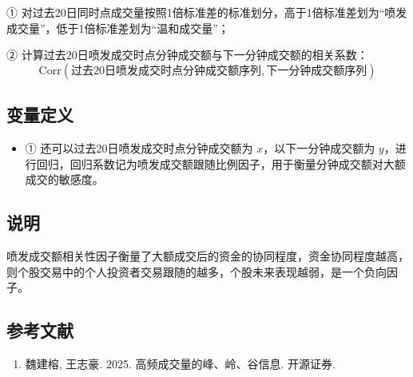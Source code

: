 \documentclass{article}
\begin{document}
① 对过去20日同时点成交量按照1倍标准差的标准划分，高于1倍标准差划为“喷发成交量”，低于1倍标准差划为“温和成交量”；

② 计算过去20日喷发成交时点分钟成交额与下一分钟成交额的相关系数：
\begin{equation}
    \mathrm{Corr}(\text{过去20日喷发成交时点分钟成交额序列}, \text{下一分钟成交额序列})
\end{equation}

\subsection{变量定义}
\begin{itemize}
    \item ① 还可以过去20日喷发成交时点分钟成交额为 \( x \)，以下一分钟成交额为 \( y \)，进行回归，回归系数记为喷发成交额跟随比例因子，用于衡量分钟成交额对大额成交的敏感度。
\end{itemize}

\subsection{说明}
喷发成交额相关性因子衡量了大额成交后的资金的协同程度，资金协同程度越高，则个股交易中的个人投资者交易跟随的越多，个股未来表现越弱，是一个负向因子。

\subsection{参考文献}
\begin{enumerate}
    \item 魏建榕, 王志豪. 2025. 高频成交量的峰、岭、谷信息. 开源证券.
\end{enumerate}
\end{document}
